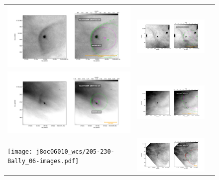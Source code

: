 \documentclass{article}
\begin{document}
\begin{figure}[htp]
\centering
\begin{tabular}{l l l}
     \includegraphics[width=0.5\linewidth, trim=60 50 100 50]{j8oc01010_wcs/w069-601-Bally_01-images.pdf}
    &\includegraphics[width=0.5\linewidth, trim=60 50 100 50]{j8oc01010_wcs/173-342-Bally_01-images.pdf}\\
    \includegraphics[width=0.5\linewidth, trim=60 50 100 50]{j8oc01010_wcs/w044-527-Bally_01-images.pdf}
    &\includegraphics[width=0.5\linewidth, trim=60 50 100 50]{j8oc01010_wcs/102-157-Bally_01-images.pdf}\\
    \texttt{[image: j8oc06010\_wcs/205-230-Bally\_06-images.pdf]} 
     &\includegraphics[width=0.5\linewidth, trim=60 50 100 50]{j8oc09010_wcs/w000-400-Bally_09-images.pdf}\\ 

\end{tabular}
\end{figure}
\end{document}

